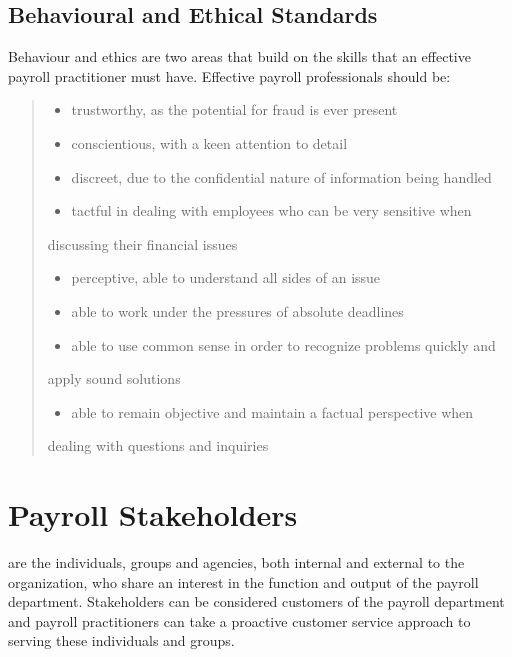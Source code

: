 \documentclass[letterpaper,10pt,english]{sphinxmanual}
\begin{document}
\section{Behavioural and Ethical Standards}
\label{\detokenize{1_introduction:behavioural-and-ethical-standards}}
\sphinxAtStartPar
Behaviour and ethics are two areas that build on the skills that an effective payroll practitioner
must have. Effective payroll professionals should be:
\begin{quote}
\begin{itemize}
\item {} 
\sphinxAtStartPar
trustworthy, as the potential for fraud is ever present

\item {} 
\sphinxAtStartPar
conscientious, with a keen attention to detail

\item {} 
\sphinxAtStartPar
discreet, due to the confidential nature of information being handled

\item {} 
\sphinxAtStartPar
tactful in dealing with employees who can be very sensitive when

\end{itemize}

\sphinxAtStartPar
discussing their financial issues
\begin{itemize}
\item {} 
\sphinxAtStartPar
perceptive, able to understand all sides of an issue

\item {} 
\sphinxAtStartPar
able to work under the pressures of absolute deadlines

\item {} 
\sphinxAtStartPar
able to use common sense in order to recognize problems quickly and

\end{itemize}

\sphinxAtStartPar
apply sound solutions
\begin{itemize}
\item {} 
\sphinxAtStartPar
able to remain objective and maintain a factual perspective when

\end{itemize}

\sphinxAtStartPar
dealing with questions and inquiries
\end{quote}


\chapter{Payroll Stakeholders}
\label{\detokenize{1_introduction:payroll-stakeholders}}
\sphinxAtStartPar
{} are the individuals, groups and agencies, both internal
and external to the organization, who share an interest in the function and
output of the payroll department. Stakeholders can be considered customers of the payroll department and payroll practitioners
can take a proactive customer service approach to serving these individuals and groups.
\end{document}
